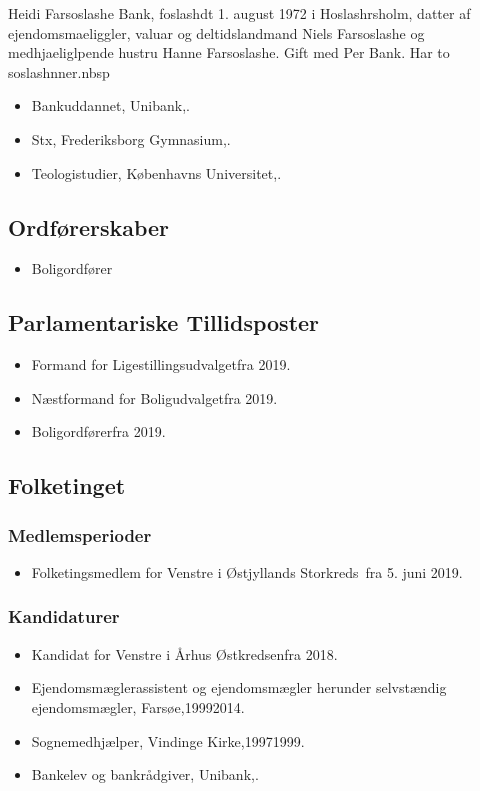 \documentclass[11pt, a4paper]{awesome-cv}
\begin{document}
\makecvheader[R]
\makelettertitle
\begin{cvletter}
Heidi Farsoslashe Bank, foslashdt 1. august 1972 i Hoslashrsholm, datter af ejendomsmaeliggler, valuar og deltidslandmand Niels Farsoslashe og medhjaeliglpende hustru Hanne Farsoslashe. Gift med Per Bank. Har to soslashnner.nbsp

\begin{itemize}
\item Bankuddannet, Unibank,.
\item Stx, Frederiksborg Gymnasium,.
\item Teologistudier, Københavns Universitet,.
\end{itemize}
\subsection*{Ordførerskaber}
\begin{itemize}
\item Boligordfører
\end{itemize}
\subsection*{Parlamentariske Tillidsposter}
\begin{itemize}
\item Formand for Ligestillingsudvalgetfra 2019.
\item Næstformand for Boligudvalgetfra 2019.
\item Boligordførerfra 2019.
\end{itemize}
\subsection*{Folketinget}
\subsubsection*{Medlemsperioder}
\begin{itemize}
\item Folketingsmedlem for Venstre i Østjyllands Storkreds fra 5. juni 2019.
\end{itemize}
\subsubsection*{Kandidaturer}
\begin{itemize}
\item Kandidat for Venstre i Århus Østkredsenfra 2018.
\end{itemize}
\begin{itemize}
\item Ejendomsmæglerassistent og ejendomsmægler herunder selvstændig ejendomsmægler, Farsøe,19992014.
\item Sognemedhjælper, Vindinge Kirke,19971999.
\item Bankelev og bankrådgiver, Unibank,.
\end{itemize}
\end{cvletter}
\end{document}
